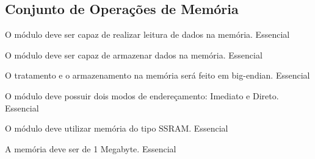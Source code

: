 \subsection{Conjunto de Operações de Memória}

	  \begin{functional}
		{O módulo deve ser capaz de realizar leitura de dados na memória.}
		{Essencial}
		
        {O módulo deve ser capaz de armazenar dados na memória.}
        {Essencial}
        
        {O tratamento e o armazenamento na memória será feito em big-endian.}
        {Essencial}
        
        {O módulo deve possuir dois modos de endereçamento: Imediato e Direto.}
        {Essencial}
        
        {O módulo deve utilizar memória do tipo SSRAM.}
        {Essencial}
        
        {A memória deve ser de 1 Megabyte.}
        {Essencial}
		 
	 \end{functional}